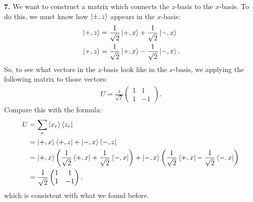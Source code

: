 \documentclass{article}
\theoremstyle{definition}
\newcommand{\f}[2]{\frac{#1}{#2}}
\newcommand{\lp}{\left(}
\newcommand{\rp}{\right)}
\begin{document}
\noindent \textbf{7.} We want to construct a matrix which connects the $z$-basis to the $x$-basis. To do this, we must know how $\ket{\pm,z}$ appears in the $x$-basis:
\begin{align*}
&\ket{+,z} = \f{1}{\sqrt{2}} \ket{+,x} + \f{1}{\sqrt{2}}\ket{-,x}\\
&\ket{+,z} = \f{1}{\sqrt{2}} \ket{+,x} - \f{1}{\sqrt{2}}\ket{-,x}.
\end{align*}
So, to see what vectors in the $z$-basis look like in  the $x$-basis, we applying the following matrix to those vectors:
\begin{align*}
U = \f{1}{\sqrt{2}}\begin{pmatrix}
1 & 1 \\ 1 & -1
\end{pmatrix}.
\end{align*}
Compare this with the formula:
\begin{align*}
U &= \sum_r \ket{x_r}\bra{z_r}\\
&= \ket{+,x}\bra{+,z} + \ket{-,x}\bra{-,z} \\
&= \ket{+,x}\lp \f{1}{\sqrt{2}} \bra{+,x} + \f{1}{\sqrt{2}}\bra{-,x} \rp + \ket{-,x} \lp \f{1}{\sqrt{2}} \bra{+,x} - \f{1}{\sqrt{2}}\bra{-,x} \rp\\
&= \f{1}{\sqrt{2}}\begin{pmatrix}
1 & 1 \\ 1 & -1
\end{pmatrix},
\end{align*}
which is consistent with what we found before. 
	
\end{document}
